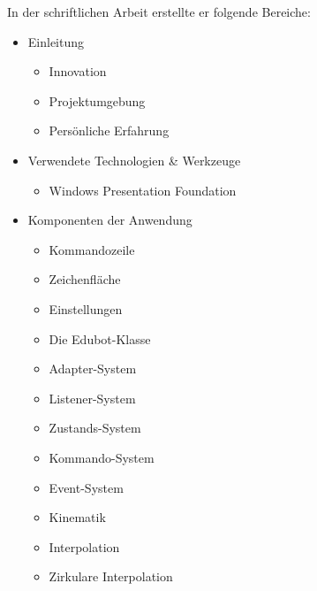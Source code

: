 \begin{itemize}
In der schriftlichen Arbeit erstellte er folgende Bereiche:
\begin{itemize}
\item Einleitung
\begin{itemize}
\item Innovation
\item Projektumgebung
\item Persönliche Erfahrung
\end{itemize}
\item Verwendete Technologien \& Werkzeuge
\begin{itemize}
\item Windows Presentation Foundation
\end{itemize}
\item Komponenten der Anwendung
\begin{itemize}
\item Kommandozeile
\item Zeichenfläche
\item Einstellungen
\end{itemize}
\begin{itemize}
\item Die Edubot-Klasse
\item Adapter-System
\item Listener-System
\item Zustands-System
\item Kommando-System
\item Event-System
\item Kinematik
\item Interpolation
\item Zirkulare Interpolation
\end{itemize}
\end{itemize}
     

\end{itemize}
